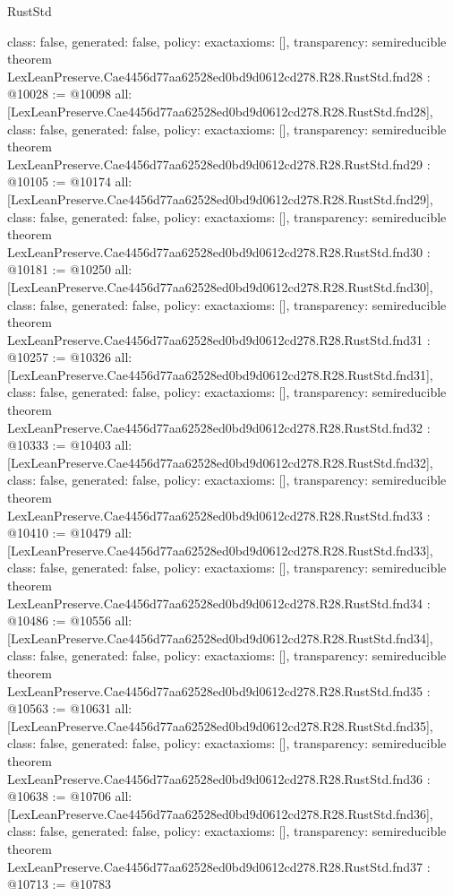 \begin{lexlean}{RustStd}
\begin{coremodule}
{  class: false,
  generated: false,
  policy: exact{axioms: []},
  transparency: semireducible
}
theorem LexLeanPreserve.Cae4456d77aa62528ed0bd9d0612cd278.R28.RustStd.fnd28 : @10028 := @10098 {
  all: [LexLeanPreserve.Cae4456d77aa62528ed0bd9d0612cd278.R28.RustStd.fnd28],
  class: false,
  generated: false,
  policy: exact{axioms: []},
  transparency: semireducible
}
theorem LexLeanPreserve.Cae4456d77aa62528ed0bd9d0612cd278.R28.RustStd.fnd29 : @10105 := @10174 {
  all: [LexLeanPreserve.Cae4456d77aa62528ed0bd9d0612cd278.R28.RustStd.fnd29],
  class: false,
  generated: false,
  policy: exact{axioms: []},
  transparency: semireducible
}
theorem LexLeanPreserve.Cae4456d77aa62528ed0bd9d0612cd278.R28.RustStd.fnd30 : @10181 := @10250 {
  all: [LexLeanPreserve.Cae4456d77aa62528ed0bd9d0612cd278.R28.RustStd.fnd30],
  class: false,
  generated: false,
  policy: exact{axioms: []},
  transparency: semireducible
}
theorem LexLeanPreserve.Cae4456d77aa62528ed0bd9d0612cd278.R28.RustStd.fnd31 : @10257 := @10326 {
  all: [LexLeanPreserve.Cae4456d77aa62528ed0bd9d0612cd278.R28.RustStd.fnd31],
  class: false,
  generated: false,
  policy: exact{axioms: []},
  transparency: semireducible
}
theorem LexLeanPreserve.Cae4456d77aa62528ed0bd9d0612cd278.R28.RustStd.fnd32 : @10333 := @10403 {
  all: [LexLeanPreserve.Cae4456d77aa62528ed0bd9d0612cd278.R28.RustStd.fnd32],
  class: false,
  generated: false,
  policy: exact{axioms: []},
  transparency: semireducible
}
theorem LexLeanPreserve.Cae4456d77aa62528ed0bd9d0612cd278.R28.RustStd.fnd33 : @10410 := @10479 {
  all: [LexLeanPreserve.Cae4456d77aa62528ed0bd9d0612cd278.R28.RustStd.fnd33],
  class: false,
  generated: false,
  policy: exact{axioms: []},
  transparency: semireducible
}
theorem LexLeanPreserve.Cae4456d77aa62528ed0bd9d0612cd278.R28.RustStd.fnd34 : @10486 := @10556 {
  all: [LexLeanPreserve.Cae4456d77aa62528ed0bd9d0612cd278.R28.RustStd.fnd34],
  class: false,
  generated: false,
  policy: exact{axioms: []},
  transparency: semireducible
}
theorem LexLeanPreserve.Cae4456d77aa62528ed0bd9d0612cd278.R28.RustStd.fnd35 : @10563 := @10631 {
  all: [LexLeanPreserve.Cae4456d77aa62528ed0bd9d0612cd278.R28.RustStd.fnd35],
  class: false,
  generated: false,
  policy: exact{axioms: []},
  transparency: semireducible
}
theorem LexLeanPreserve.Cae4456d77aa62528ed0bd9d0612cd278.R28.RustStd.fnd36 : @10638 := @10706 {
  all: [LexLeanPreserve.Cae4456d77aa62528ed0bd9d0612cd278.R28.RustStd.fnd36],
  class: false,
  generated: false,
  policy: exact{axioms: []},
  transparency: semireducible
}
theorem LexLeanPreserve.Cae4456d77aa62528ed0bd9d0612cd278.R28.RustStd.fnd37 : @10713 := @10783 {
}
\end{coremodule}
\end{lexlean}
